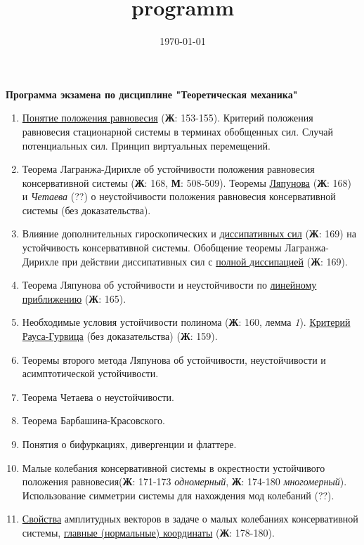 \documentclass[a4paper,12pt]{article}
\title{programm}
\date{\today}
\newcommand{\jur}[1]{\textbf{Ж}: #1}
\newcommand{\mar}[1]{\textbf{М}: #1}
\begin{document}
	\begin{center}
		\large\textbf{Программа экзамена по дисциплине "Теоретическая механика"}
	\end{center}
	\begin{enumerate}
	\item \underline{Понятие положения равновесия} (\jur{153-155}). Критерий положения равновесия стационарной системы в терминах обобщенных сил. Случай потенциальных сил. Принцип  виртуальных перемещений.
	
	\item Теорема  Лагранжа-Дирихле  об  устойчивости положения равновесия консервативной  системы (\jur{168}, \mar{508-509}). Теоремы \underline{Ляпунова} (\jur{168}) и \textit{Четаева} (??) о неустойчивости положения равновесия консервативной системы (без доказательства).
	
	\item Влияние дополнительных гироскопических и \underline{диссипативных сил} (\jur{169}) на устойчивость консервативной системы. Обобщение теоремы Лагранжа-Дирихле при действии диссипативных сил с \underline{полной диссипацией} (\jur{169}).
	
	\item Теорема Ляпунова об устойчивости и неустойчивости по \underline{линейному приближению} (\jur{165}). 
	
	\item Необходимые условия устойчивости полинома (\jur{160}, лемма \textit{1}). \underline{Критерий  Рауса-Гурвица} (без доказательства) (\jur{159}).
	
	\item Теоремы второго метода Ляпунова об устойчивости, неустойчивости и асимптотической устойчивости.
	
	\item Теорема Четаева о неустойчивости.
	
	\item Теорема Барбашина-Красовского.
	
	\item Понятия о бифуркациях, дивергенции и флаттере. 
	
	\item Малые колебания консервативной системы в окрестности устойчивого положения  равновесия(\jur{171-173} \textit{одномерный}, \jur{174-180} \textit{многомерный}). Использование симметрии системы для нахождения мод колебаний (??).
	
	\item \underline{Свойства} амплитудных векторов в задаче о малых колебаниях консервативной системы, \underline{главные (нормальные) координаты} (\jur{178-180}).
	

\end{enumerate}
\end{document}
